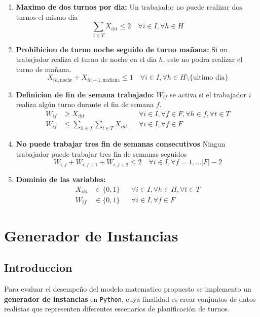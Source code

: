 \documentclass{article}
\begin{document}
\begin{enumerate}
    \item \textbf{Maximo de dos turnos por dia:}
    Un trabajador no puede realizar dos turnos el mismo dia
    \begin{equation}
        \sum_{t \in T} X_{iht} \le 2
        \quad \forall i \in I, \forall h \in H
    \end{equation}
    \item \textbf{Prohibicion de turno noche seguido de turno mañana:}
    Si un trabajador realiza el turno de noche en el dia $h$, este no podra realizar el turno de mañana. 
    \begin{equation}
        X_{ih, \text{noche}} + X_{ih + 1, \text{mañana}} \le 1
        \quad \forall i \in I, \forall h \in H \setminus \{\text{ultimo dia}\}
    \end{equation}
    \item \textbf{Definicion de fin de semana trabajado:}
    $W_{if}$ se activa si el trabajador $i$ realiza algún turno durante el fin de semana $f$.
    \begin{align}
        W_{if} &\ge X_{iht} && \forall i \in I, \forall f \in F, \forall h \in f, \forall t \in T \\
        W_{if} &\le \sum_{h \in f} \sum_{t \in T} X_{iht} && \forall i \in I, \forall f \in F
    \end{align}
    \item \textbf{No puede trabajar tres fin de semanas consecutivos}
    Ningun trabajador puede trabajar tres fin de semanas seguidos
    \begin{equation}
        W_{i,f} + W_{i, f+1} + W_{i, f+2} \le 2
        \quad \forall i \in I, \forall f = 1, \dots |F| -2
    \end{equation}
    
    \item \textbf{Dominio de las variables:} 
    \begin{align}
        X_{iht} &\in \{0,1\} && \forall i \in I, \forall h \in H, \forall t \in T\\
        W_{if} &\in \{0,1\} && \forall i \in I, \forall f \in F
    \end{align}
    
\end{enumerate}

\section*{Generador de Instancias}

\subsection*{Introduccion}
Para evaluar el desempeño del modelo matematico propuesto se implemento un \textbf{generador de instancias} en \texttt{Python}, cuya finalidad es crear conjuntos de datos realistas que representen diferentes escenarios de planificación de turnos. 
\end{document}
